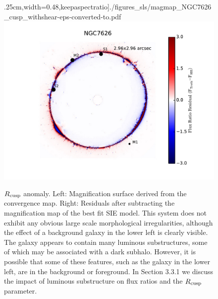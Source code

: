 \begin{itemize}
\begin{figure}
		.25cm,width=0.48\linewidth,keepaspectratio]{./figures_sls/magmap_NGC7626_cusp_withshear-eps-converted-to.pdf}
		\includegraphics[clip,trim=2.5cm .5cm 1cm
		.25cm,width=0.48\linewidth,keepaspectratio]{./figures_sls/res_map_NGC7626_cusp_withshear-eps-converted-to.pdf}
		\caption[Map of magnification residuals for mock lens NGC7626]{\label{fig:magmaps_NGC7626} $R_{\rm{cusp}}$ anomaly. Left: Magnification surface derived from the convergence map. Right: Residuals after subtracting the magnification map of the best fit SIE model. This system does not exhibit any obvious large scale morphological irregularities, although the effect of a background galaxy in the lower left is clearly visible. The galaxy appears to contain many luminous substructures, some of which may be associated with a dark subhalo. However, it is possible that some of these features, such as the galaxy in the lower left, are in the background or foreground. In Section 3.3.1 we discuss the impact of luminous substructure on flux ratios and the $R_{\rm{cusp}}$ parameter.}
	\end{figure} 

\end{itemize}
